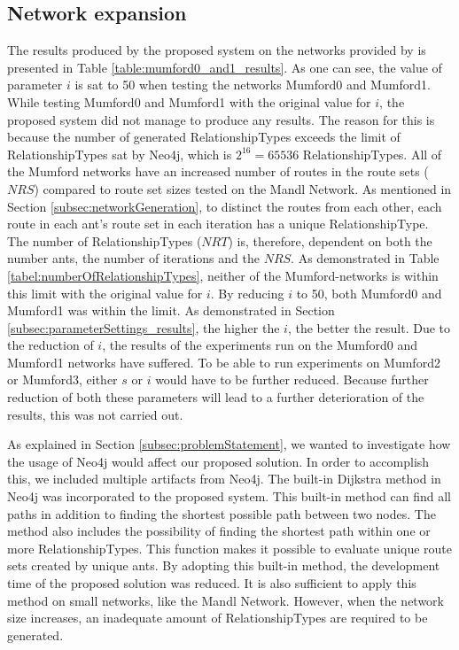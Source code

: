 \subsection{Network expansion}
\label{subsec:networkExpansion}

The results produced by the proposed system on the networks provided by \citet{mumford13} is presented in  Table \vref{table:mumford0_and1_results}. As one can see, the value of parameter $i$ is sat to 50 when testing the networks Mumford0 and Mumford1. While testing Mumford0 and Mumford1 with the original value for $i$, the proposed system did not manage to produce any results. The reason for this is because the number of generated RelationshipTypes exceeds the limit of RelationshipTypes sat by Neo4j, which is $2^{16} = 65 536$ RelationshipTypes. All of the Mumford networks have an increased number of routes in the route sets ($NRS$) compared to route set sizes tested on the Mandl Network. As mentioned in Section \vref{subsec:networkGeneration}, to distinct the routes from each other, each route in each ant's route set in each iteration has a unique RelationshipType. The number of RelationshipTypes ($NRT$) is, therefore, dependent on both the number ants, the number of iterations and the $NRS$. As demonstrated in Table \vref{tabel:numberOfRelationshipTypes}, neither of the Mumford-networks is within this limit with the original value for $i$. By reducing $i$ to 50, both Mumford0 and Mumford1 was within the limit. As demonstrated in Section \vref{subsec:parameterSettings_results}, the higher the $i$, the better the result. Due to the reduction of $i$, the results of the experiments run on the Mumford0 and Mumford1 networks have suffered. To be able to run experiments on Mumford2 or Mumford3, either $s$ or $i$ would have to be further reduced. Because further reduction of both these parameters will lead to a further deterioration of the results, this was not carried out.

As explained in Section \vref{subsec:problemStatement}, we wanted to investigate how the usage of Neo4j would affect our proposed solution. In order to accomplish this, we included multiple artifacts from Neo4j.  The built-in Dijkstra method in Neo4j was incorporated to the proposed system. This built-in method can find all paths in addition to finding the shortest possible path between two nodes. The method also includes the possibility of finding the shortest path within one or more RelationshipTypes. This function makes it possible to evaluate unique route sets created by unique ants. By adopting this built-in method, the development time of the proposed solution was reduced. It is also sufficient to apply this method on small networks, like the Mandl Network. However, when the network size increases, an inadequate amount of RelationshipTypes are required to be generated.

